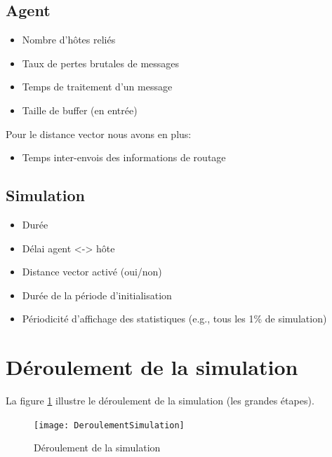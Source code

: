\documentclass[a4paper,11pt]{article}
\begin{document}
\subsection{Agent}

\begin{itemize}
 \item Nombre d'hôtes reliés
 \item Taux de pertes brutales de messages
 \item Temps de traitement d'un message
 \item Taille de buffer (en entrée)
\end{itemize}

Pour le distance vector nous avons en plus:
\begin{itemize}
 \item Temps inter-envois des informations de routage
\end{itemize}

\subsection{Simulation}
\begin{itemize}
 \item Durée
 \item Délai agent <-> hôte
 \item Distance vector activé (oui/non)
 \item Durée de la période d'initialisation
 \item Périodicité d'affichage des statistiques (e.g., tous les 1\% de simulation)
\end{itemize}









\section{Déroulement de la simulation}
La figure \ref{fig:deroulement-simulation} illustre le déroulement de la simulation (les grandes étapes).

\begin{figure}[h!t]
  \centering
    \texttt{[image: DeroulementSimulation]}
  \caption{Déroulement de la simulation}
  \label{fig:deroulement-simulation}
\end{figure}
\end{document}
